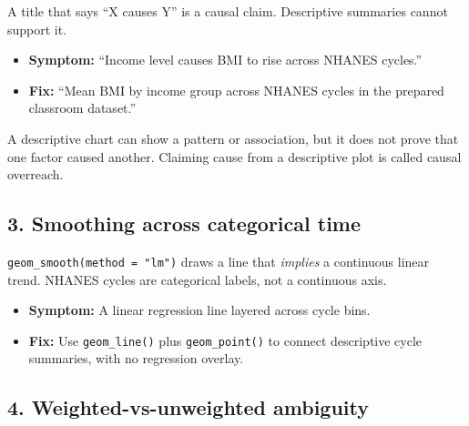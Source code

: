 \documentclass[
  letterpaper,
  DIV=11,
  numbers=noendperiod,
  oneside]{scrreprt}
\providecommand{\tightlist}{%
  \setlength{\itemsep}{0pt}\setlength{\parskip}{0pt}}
\begin{document}
A title that says ``X causes Y'' is a causal claim. Descriptive
summaries cannot support it.

\begin{itemize}
\tightlist
\item
  \textbf{Symptom:} ``Income level causes BMI to rise across NHANES
  cycles.''
\item
  \textbf{Fix:} ``Mean BMI by income group across NHANES cycles in the
  prepared classroom dataset.''
\end{itemize}

\begin{tcolorbox}[enhanced jigsaw, title=\textcolor{quarto-callout-note-color}{\faInfo}\hspace{0.5em}{Definition: causal overreach}, arc=.35mm, toptitle=1mm, colframe=quarto-callout-note-color-frame, toprule=.15mm, leftrule=.75mm, bottomtitle=1mm, opacityback=0, bottomrule=.15mm, coltitle=black, breakable, opacitybacktitle=0.6, titlerule=0mm, colback=white, left=2mm, colbacktitle=quarto-callout-note-color!10!white, rightrule=.15mm]

A descriptive chart can show a pattern or association, but it does not
prove that one factor caused another. Claiming cause from a descriptive
plot is called causal overreach.

\end{tcolorbox}

\subsection*{3. Smoothing across categorical
time}\label{smoothing-across-categorical-time}

\texttt{geom\_smooth(method\ =\ "lm")} draws a line that \emph{implies}
a continuous linear trend. NHANES cycles are categorical labels, not a
continuous axis.

\begin{itemize}
\tightlist
\item
  \textbf{Symptom:} A linear regression line layered across cycle bins.
\item
  \textbf{Fix:} Use \texttt{geom\_line()} plus \texttt{geom\_point()} to
  connect descriptive cycle summaries, with no regression overlay.
\end{itemize}

\subsection*{4. Weighted-vs-unweighted
ambiguity}\label{weighted-vs-unweighted-ambiguity}
\end{document}

